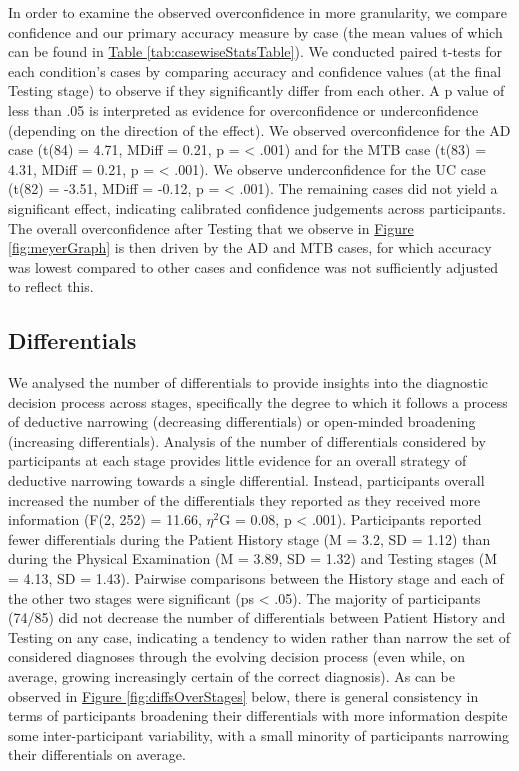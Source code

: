 \documentclass[a4paper, nobind]{templates/ociamthesis}
\begin{document}
\newpage

In order to examine the observed overconfidence in more granularity, we compare confidence and our primary accuracy measure by case (the mean values of which can be found in \hyperref[tab:casewiseStatsTable]{Table \ref{tab:casewiseStatsTable}}). We conducted paired t-tests for each condition's cases by comparing accuracy and confidence values (at the final Testing stage) to observe if they significantly differ from each other. A p value of less than .05 is interpreted as evidence for overconfidence or underconfidence (depending on the direction of the effect). We observed overconfidence for the AD case (t(84) = 4.71, MDiff = 0.21, p = \textless{} .001) and for the MTB case (t(83) = 4.31, MDiff = 0.21, p = \textless{} .001). We observe underconfidence for the UC case (t(82) = -3.51, MDiff = -0.12, p = \textless{} .001). The remaining cases did not yield a significant effect, indicating calibrated confidence judgements across participants. The overall overconfidence after Testing that we observe in \hyperref[fig:meyerGraph]{Figure \ref{fig:meyerGraph}} is then driven by the AD and MTB cases, for which accuracy was lowest compared to other cases and confidence was not sufficiently adjusted to reflect this.

\subsection{Differentials}\label{differentials}

We analysed the number of differentials to provide insights into the diagnostic decision process across stages, specifically the degree to which it follows a process of deductive narrowing (decreasing differentials) or open-minded broadening (increasing differentials). Analysis of the number of differentials considered by participants at each stage provides little evidence for an overall strategy of deductive narrowing towards a single differential. Instead, participants overall increased the number of the differentials they reported as they received more information (F(2, 252) = 11.66, \(\eta^2\)G = 0.08, p \textless{} .001). Participants reported fewer differentials during the Patient History stage (M = 3.2, SD = 1.12) than during the Physical Examination (M = 3.89, SD = 1.32) and Testing stages (M = 4.13, SD = 1.43). Pairwise comparisons between the History stage and each of the other two stages were significant (ps \textless{} .05). The majority of participants (74/85) did not decrease the number of differentials between Patient History and Testing on any case, indicating a tendency to widen rather than narrow the set of considered diagnoses through the evolving decision process (even while, on average, growing increasingly certain of the correct diagnosis). As can be observed in \hyperref[fig:diffsOverStages]{Figure \ref{fig:diffsOverStages}} below, there is general consistency in terms of participants broadening their differentials with more information despite some inter-participant variability, with a small minority of participants narrowing their differentials on average.
\end{document}
